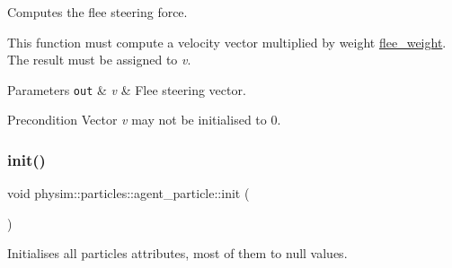 Computes the flee steering force. 

This function must compute a velocity vector multiplied by weight \hyperlink{classphysim_1_1particles_1_1agent__particle_ad7824cd0742b42f803542d8b4d5eae98}{flee\+\_\+weight}. The result must be assigned to {\itshape v}.


\begin{DoxyParams}[1]{Parameters}
\mbox{\tt out}  & {\em v} & Flee steering vector. \\
\hline
\end{DoxyParams}
\begin{DoxyPrecond}{Precondition}
Vector {\itshape v} may not be initialised to 0. 
\end{DoxyPrecond}
\mbox{\label{classphysim_1_1particles_1_1agent__particle_ac13082909f480fc55d406321c77d38b1}} 
\subsubsection{\texorpdfstring{init()}{init()}}
{\footnotesize\ttfamily void physim\+::particles\+::agent\+\_\+particle\+::init (\begin{DoxyParamCaption}{ }\end{DoxyParamCaption})\hspace{0.3cm}{\ttfamily [virtual]}}



Initialises all particle\textquotesingle{}s attributes, most of them to null values. 

